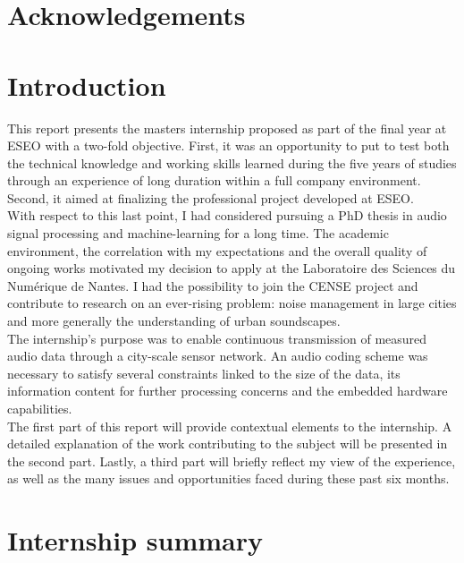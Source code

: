 \documentclass[12pt,times,onecolumn]{article}
\begin{document}


\section*{Acknowledgements}

\clearpage
\section*{Introduction}
This report presents the masters internship proposed as part of the final year at ESEO with a two-fold objective. First, it was an opportunity to put to test both the technical knowledge and working skills learned during the five years of studies through an experience of long duration within a full company environment. Second, it aimed at finalizing the professional project developed at ESEO.\\

With respect to this last point, I had considered pursuing a PhD thesis in audio signal processing and machine-learning for a long time. The academic environment, the correlation with my expectations and the overall quality of ongoing works motivated my decision to apply at the Laboratoire des Sciences du Num\'erique de Nantes. I had the possibility to join the CENSE project and contribute to research on an ever-rising problem: noise management in large cities and more generally the understanding of urban soundscapes.\\

The internship's purpose was to enable continuous transmission of measured audio data through a city-scale sensor network. An audio coding scheme was necessary to satisfy several constraints linked to the size of the data, its information content for further processing concerns and the embedded hardware capabilities.\\

The first part of this report will provide contextual elements to the internship. A detailed explanation of the work contributing to the subject will be presented in the second part. Lastly, a third part will briefly reflect my view of the experience, as well as the many issues and opportunities faced during these past six months.


\clearpage
\section*{Internship summary}
\end{document}
